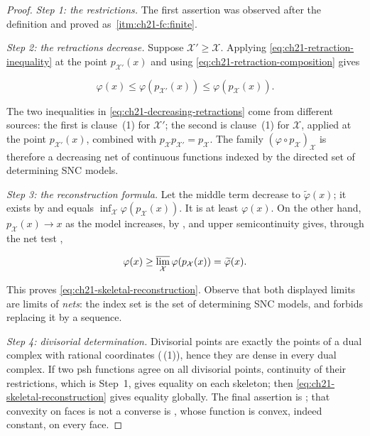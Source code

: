 \begin{proof}
\emph{Step 1: the restrictions.}
The first assertion was observed after the definition and proved as
\,\cref{itm:ch21-fc:finite}.

\emph{Step 2: the retractions decrease.}
Suppose
$\mathcal X'\geq\mathcal X$.  Applying
\eqref{eq:ch21-retraction-inequality} at the point
$p_{\mathcal X'}(x)$ and using
\eqref{eq:ch21-retraction-composition} gives

\begin{equation}
\label{eq:ch21-decreasing-retractions}
 \varphi(x)
 \leq\varphi(p_{\mathcal X'}(x))
 \leq\varphi(p_{\mathcal X}(x)).
\end{equation}

The two inequalities in \eqref{eq:ch21-decreasing-retractions} come from
different sources: the first is clause~(1) for $\mathcal X'$; the second is
clause~(1) for $\mathcal X$, applied at the point
$p_{\mathcal X'}(x)$, combined with
$p_{\mathcal X}p_{\mathcal X'}=p_{\mathcal X}$.  The family
$(\varphi\circ p_{\mathcal X})_{\mathcal X}$ is therefore a decreasing net
of continuous functions indexed by the directed set of determining SNC
models.

\emph{Step 3: the reconstruction formula.}
Let the middle term decrease to $\widetilde\varphi(x)$; it exists by
 and equals
$\inf_{\mathcal X}\varphi(p_{\mathcal X}(x))$.  It is at least
$\varphi(x)$.  On the other hand, $p_{\mathcal X}(x)\to x$ as
the model increases, by , and upper
semicontinuity gives, through the net test
,

\[
 \varphi(x)\geq
 \varlimsup_{\mathcal X}\varphi(p_{\mathcal X}(x))
 =\widetilde\varphi(x).
\]

This proves \eqref{eq:ch21-skeletal-reconstruction}.  Observe that both
displayed limits are limits of \emph{nets}: the index set is the set of
determining SNC models, and  forbids
replacing it by a sequence.

\emph{Step 4: divisorial determination.}
Divisorial points are exactly the points of a dual complex with rational
coordinates (\,(1)), hence they are
dense in every dual complex.
If two psh functions agree on all divisorial points, continuity of their
restrictions, which is Step~1, gives
equality on each skeleton; then
\eqref{eq:ch21-skeletal-reconstruction} gives equality globally.  The final
assertion is ; that convexity on faces
is not a converse is , whose function is
convex, indeed constant, on every face.
\end{proof}

